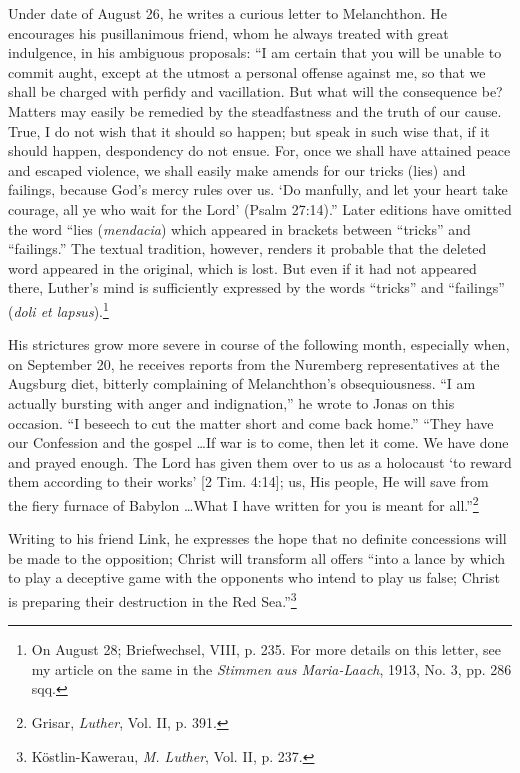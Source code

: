 Under date of August 26, he writes a curious letter to Melanchthon. He
encourages his pusillanimous friend, whom he always treated
with great indulgence, in his ambiguous proposals: “I am certain that
you will be unable to commit aught, except at the utmost a personal
offense against me, so that we shall be charged with perfidy and vacillation.
But what will the consequence be? Matters may easily be
remedied by the steadfastness and the truth of our cause. True, I do
not wish that it should so happen; but speak in such wise that, if it
should happen, despondency do not ensue. For, once we shall have
attained peace and escaped violence, we shall easily make amends for
our tricks (lies) and failings, because God’s mercy rules over us. ‘Do
manfully, and let your heart take courage, all ye who wait for the
Lord’ (Psalm 27:14).” Later editions have omitted the word
“lies (\textit{mendacia}) which appeared in brackets between “tricks” and
“failings.” The textual tradition, however, renders it probable that
the deleted word appeared in the original, which is lost. But even if it
had not appeared there, Luther’s mind is sufficiently expressed by the
words “tricks” and “failings” (\textit{doli et lapsus}).\footnote
{On August 28; Briefwechsel, VIII, p. 235. For more details on this letter, see my
article on the same in the \textit{Stimmen aus Maria-Laach}, 1913, No. 3, pp. 286 sqq.}

His strictures grow more severe in course of the following month, especially
when, on September 20, he receives reports from the Nuremberg representatives
at the Augsburg diet, bitterly complaining of Melanchthon’s obsequiousness. “I
am actually bursting with anger and indignation,” he wrote to Jonas on this
occasion. “I beseech to cut the matter short and come back home.” “They have
our Confession and the gospel \dots If war is to come, then let it come. We
have done and prayed enough. The Lord has given them over to us as a holocaust
‘to reward them according to their works’ [2 Tim. 4:14]; us, His people, He
will save from the fiery furnace of Babylon \dots What I have written for you
is meant for all.”\footnote{Grisar, \textit{Luther}, Vol. II, p. 391.}

Writing to his friend Link, he expresses the hope that no definite
concessions will be made to the opposition; Christ will transform
all offers “into a lance by which to play a deceptive game with the
opponents who intend to play us false; Christ is preparing their destruction
in the Red Sea.”\footnote{Köstlin-Kawerau, \textit{M. Luther}, Vol. II, p. 237.}

